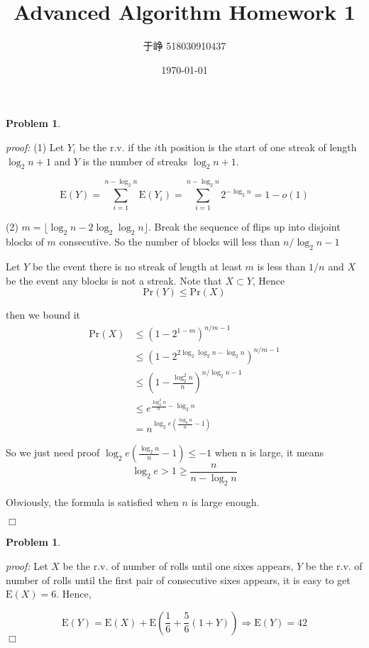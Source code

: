 \documentclass{article}
\title{Advanced Algorithm Homework 1}
\author{于峥 518030910437}
\date{\today}
\newtheorem{problem}[theorem]{Problem}
\newenvironment{solution}{\noindent \textit{proof:}}{$\Box$}
\begin{document}
    \maketitle
    
\begin{problem}
\end{problem}
\begin{solution}
    (1)  Let $Y_i$ be the r.v. if the $i$th position is the start of one streak of length $\log_2n+1$ and $Y$ is the number of streaks $\log_2n+1$.
    
        $$
        \mathrm{E}(Y) = \sum_{i=1}^{n - \log_2n} \mathrm{E}(Y_i) = \sum_{i=1}^{n - \log_2n} 2^{-\log_2n} = 1 - o(1)
        $$ 
    
    (2) $m = \lfloor \log_2n - 2\log_2\log_2 n \rfloor$. Break the sequence of flips up into disjoint blocks
    of $m$ consecutive. So the number of blocks will less than $n/\log_2n-1$
    
    Let $Y$ be the event there is no streak of length at least $m$ is less than $1/n$ and
    $X$ be the event any blocks is not a streak. Note that $X \subset Y$, Hence
    $$
        \mathrm{Pr}(Y) \le \mathrm{Pr}(X)
    $$
    
    then we bound it
    \begin{align*}
        \mathrm{Pr}(X) 
        &\leq \left( 1-2^{1-m}\right)^{n/m-1} \\
        &\leq \left( 1-2^{2\log_2\log_2n - \log_2n}\right)^{n/m-1} \\
        &\leq \left(1-\frac {\log_2^2 n} {n}\right)^{n/\log_2n-1} \\
        &\leq e^{\frac {\log_2^2n} {n} - \log_2n} \\
        &= n^{\log_2 e (\frac {\log_2 n} {n} - 1)}
    \end{align*}
    
    So we just need  proof $\log_2 e (\frac {\log_2 n} {n} - 1) \leq -1$ when n is large,
    it means 
    $$ \log_2e > 1 \geq \frac {n} {n-\log_2 n} $$
    
    Obviously, the formula is satisfied when $n$ is large enough.
    
    
\end{solution}

\begin{problem}
\end{problem}
\begin{solution}
    Let  $X$ be the r.v. of number of rolls until one sixes appears, $Y$ be the r.v. of number of rolls until the first pair of consecutive sixes appears, it is easy to get $\mathrm{E}(X) = 6$. Hence,
    
    $$\mathrm{E}(Y) = \mathrm{E}(X) + \mathrm{E}(\frac 1 6 + \frac 5 6(1 + Y)) \Rightarrow \mathrm{E}(Y) = 42$$
\end{solution}
\end{document}
